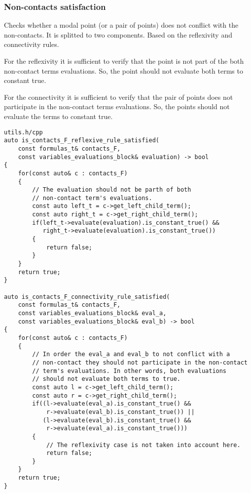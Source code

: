 \documentclass{article}
\begin{document}
	\newpage
	\subsubsection*{Non-contacts satisfaction}
	Checks whether a modal point (or a pair of points) does not conflict with the non-contacts. It is splitted to two components. Based on the reflexivity and connectivity rules.

	For the reflexivity it is sufficient to verify that the point is not part of the both non-contact terms evaluations. So, the point should not evaluate both terms to constant true.

	For the connectivity it is sufficient to verify that the pair of points does not participate in the non-contact terms evaluations. So, the points should not evaluate the terms to constant true.
\begin{lstlisting}
utils.h/cpp
auto is_contacts_F_reflexive_rule_satisfied(
	const formulas_t& contacts_F,
	const variables_evaluations_block& evaluation) -> bool
{
    for(const auto& c : contacts_F)
    {
        // The evaluation should not be parth of both
        // non-contact term's evaluations.
        const auto left_t = c->get_left_child_term();
        const auto right_t = c->get_right_child_term();
        if(left_t->evaluate(evaluation).is_constant_true() &&
           right_t->evaluate(evaluation).is_constant_true())
        {
            return false;
        }
    }
    return true;
}

auto is_contacts_F_connectivity_rule_satisfied(
	const formulas_t& contacts_F,
	const variables_evaluations_block& eval_a,
	const variables_evaluations_block& eval_b) -> bool
{
    for(const auto& c : contacts_F)
    {
        // In order the eval_a and eval_b to not conflict with a
        // non-contact they should not participate in the non-contact
        // term's evaluations. In other words, both evaluations
        // should not evaluate both terms to true.
        const auto l = c->get_left_child_term();
        const auto r = c->get_right_child_term();
        if((l->evaluate(eval_a).is_constant_true() &&
            r->evaluate(eval_b).is_constant_true()) ||
           (l->evaluate(eval_b).is_constant_true() &&
            r->evaluate(eval_a).is_constant_true()))
        {
            // The reflexivity case is not taken into account here.
            return false;
        }
    }
    return true;
}

\end{lstlisting}

	\newpage
\end{document}
